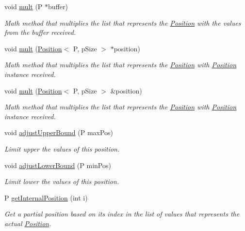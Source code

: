 \begin{DoxyCompactItemize}
void \hyperlink{structPosition_a73c9e6e75985f419ab44cc4a60c508b4}{mult} (P $\ast$buffer)
\begin{DoxyCompactList}\small\item\em Math method that multiplies the list that represents the \hyperlink{structPosition}{Position} with the values from the buffer received. \end{DoxyCompactList}\item 
void \hyperlink{structPosition_a8cff5fed8bf343eec2689374cb076de1}{mult} (\hyperlink{structPosition}{Position}$<$ P, p\+Size $>$ $\ast$position)
\begin{DoxyCompactList}\small\item\em Math method that multiplies the list that represents the \hyperlink{structPosition}{Position} with \hyperlink{structPosition}{Position} instance received. \end{DoxyCompactList}\item 
void \hyperlink{structPosition_af6b3fb56cbfec3b133fcc5fb78a54ebd}{mult} (\hyperlink{structPosition}{Position}$<$ P, p\+Size $>$ \&position)
\begin{DoxyCompactList}\small\item\em Math method that multiplies the list that represents the \hyperlink{structPosition}{Position} with \hyperlink{structPosition}{Position} instance received. \end{DoxyCompactList}\item 
void \hyperlink{structPosition_a0c70a4890ea8ba9e8b9ed6b4f6030751}{adjust\+Upper\+Bound} (P max\+Pos)
\begin{DoxyCompactList}\small\item\em Limit upper the values of this position. \end{DoxyCompactList}\item 
void \hyperlink{structPosition_aae9a6d862e9da174648a84f876f8d78d}{adjust\+Lower\+Bound} (P min\+Pos)
\begin{DoxyCompactList}\small\item\em Limit lower the values of this position. \end{DoxyCompactList}\item 
P \hyperlink{structPosition_af5e0d1ae77f5840a090325a7ba9fd8b5}{get\+Internal\+Position} (int i)
\begin{DoxyCompactList}\small\item\em Get a partial position based on its index in the list of values that represents the actual \hyperlink{structPosition}{Position}. \end{DoxyCompactList}\item 

\end{DoxyCompactItemize}
